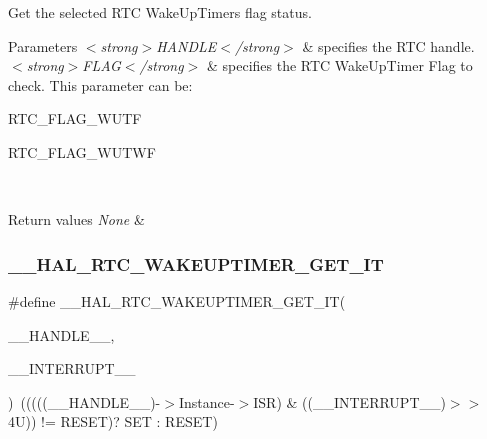 Get the selected R\+TC Wake\+Up\+Timer\textquotesingle{}s flag status. 


\begin{DoxyParams}{Parameters}
{\em $<$strong$>$\+H\+A\+N\+D\+L\+E$<$/strong$>$} & specifies the R\+TC handle. \\
\hline
{\em $<$strong$>$\+F\+L\+A\+G$<$/strong$>$} & specifies the R\+TC Wake\+Up\+Timer Flag to check. This parameter can be\+: \begin{DoxyItemize}
\item R\+T\+C\+\_\+\+F\+L\+A\+G\+\_\+\+W\+U\+TF \item R\+T\+C\+\_\+\+F\+L\+A\+G\+\_\+\+W\+U\+T\+WF \end{DoxyItemize}
\\
\hline
\end{DoxyParams}

\begin{DoxyRetVals}{Return values}
{\em None} & \\
\hline
\end{DoxyRetVals}
\mbox{\label{group___r_t_c_ex___wake_up___timer_gaac6051af0e8efabdae50b7051554355b}} 
\subsubsection{\texorpdfstring{\+\_\+\+\_\+\+H\+A\+L\+\_\+\+R\+T\+C\+\_\+\+W\+A\+K\+E\+U\+P\+T\+I\+M\+E\+R\+\_\+\+G\+E\+T\+\_\+\+IT}{\_\_HAL\_RTC\_WAKEUPTIMER\_GET\_IT}}
{\footnotesize\ttfamily \#define \+\_\+\+\_\+\+H\+A\+L\+\_\+\+R\+T\+C\+\_\+\+W\+A\+K\+E\+U\+P\+T\+I\+M\+E\+R\+\_\+\+G\+E\+T\+\_\+\+IT(\begin{DoxyParamCaption}\item[{}]{\+\_\+\+\_\+\+H\+A\+N\+D\+L\+E\+\_\+\+\_\+,  }\item[{}]{\+\_\+\+\_\+\+I\+N\+T\+E\+R\+R\+U\+P\+T\+\_\+\+\_\+ }\end{DoxyParamCaption})~(((((\+\_\+\+\_\+\+H\+A\+N\+D\+L\+E\+\_\+\+\_\+)-\/$>$Instance-\/$>$I\+SR) \& ((\+\_\+\+\_\+\+I\+N\+T\+E\+R\+R\+U\+P\+T\+\_\+\+\_\+)$>$$>$ 4\+U)) != R\+E\+S\+E\+T)? S\+E\+T \+: R\+E\+S\+E\+T)}



